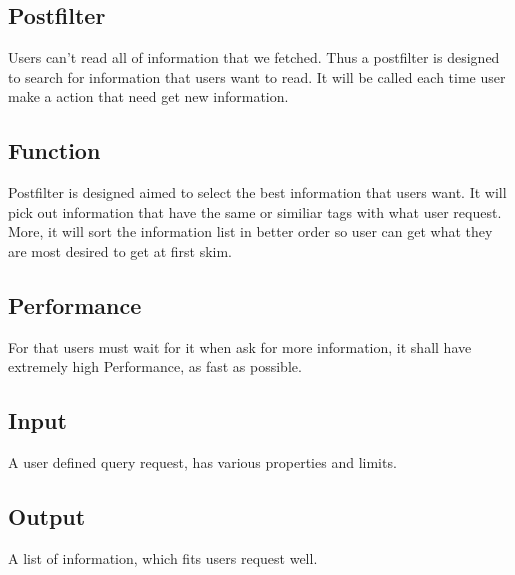 
\subsection{Postfilter}
  Users can't read all of information that we fetched.
  Thus a postfilter is designed to search for information that users want to read.
  It will be called each time user make a action that need get new information.

  \subsection{Function}
    Postfilter is designed aimed to select the best information that users want.
    It will pick out information that have the same or similiar tags with what user request.
    More, it will sort the information list in better order so user can get what they are most desired to get at first skim.

  \subsection{Performance}
    For that users must wait for it when ask for more information, it shall have extremely high Performance, as fast as possible.

  \subsection{Input}
    A user defined query request, has various properties and limits.

  \subsection{Output}
    A list of information, which fits users request well.

